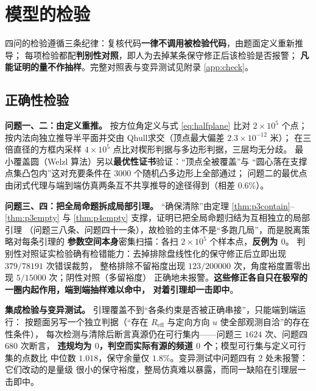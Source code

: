 \documentclass[withoutpreface, bwprint]{cumcmthesis}
\begin{document}
\section{模型的检验}
\label{sec:check}

四问的检验遵循三条纪律：复核代码\textbf{一律不调用被检验代码}，由题面定义重新推导；
每项检验都配\textbf{判别性对照}，即人为去掉某条保守修正后该检验是否报警；
\textbf{凡能证明的量不作抽样}。完整对照表与变异测试见附录 \ref{app:check}。

\subsection{正确性检验}
\label{sec:p1check}
\label{sec:p2check}
\label{sec:p3check}
\label{sssec:p4check}

\textbf{问题一、二：由定义重推。} 按方位角定义与式 \eqref{eq:halfplane} 比对 $2\times10^5$ 个点；
按内法向独立推导半平面并交由 Qhull\cite{qhull}求交（顶点最大偏差 $2.3\times10^{-12}$ 米）；
在三倍直径的方框内采样 $4\times10^5$ 点比对楔形判据与多边形判据，三层均无分歧。
最小覆盖圆（Welzl 算法\cite{welzl}）另以\textbf{最优性证书}验证：“顶点全被覆盖”与
“圆心落在支撑点集凸包内”这对充要条件\cite{rockafellar}在 $3000$ 个随机凸多边形上全部通过；
问题二的最优点由闭式代理与端到端仿真两条互不共享推导的途径得到（相差 $0.6\%$）。

\textbf{问题三、四：把全局命题拆成局部引理。} “确保清除”由定理 \ref{thm:p3contain}--%
\ref{thm:p3empty} 与 \ref{thm:p4empty} 支撑，证明已把全局命题归结为互相独立的局部引理
（问题三八条、问题四十一条），故检验的主体不是“多跑几局”，而是脱离策略对每条引理的
\textbf{参数空间本身}密集扫描：各扫 $2\times10^5$ 个样本点，\textbf{反例为 $0$}。
判别性对照证实检验确有检错能力：去掉排除盘线性化的保守修正后立即出现 $379/78191$ 次错误裁剪，
整格排除不留裕度出现 $123/200000$ 次，角度裕度置零出现 $5/15000$ 次；阴性对照（多留裕度）
正确地未报警。\textbf{这些修正各自只在极窄的一圈内起作用，端到端抽样难以命中，
对着引理却一击即中}。

\textbf{集成检验与变异测试。} 引理覆盖不到“各条约束是否被正确串接”，只能端到端运行：
按题面另写一个独立判据（“存在 $R_{\mathrm{eff}}$ 与定向方向 $u$ 使全部观测自洽”的存在性条件），
每次检测与清除后断言真源仍在可行集内——问题三 $1624$ 次、问题四 $680$ 次断言，
\textbf{违规均为 $0$，判空而实际有源的频道 $0$ 个}；模型可行集与定义可行集的点数比
中位数 $1.018$，保守余量仅 $1.8\%$。变异测试中问题四有 $2$ 处未报警：它们改动的是量级
很小的保守裕度，整局仿真难以暴露，而同一缺陷在引理层一击即中。
\end{document}
